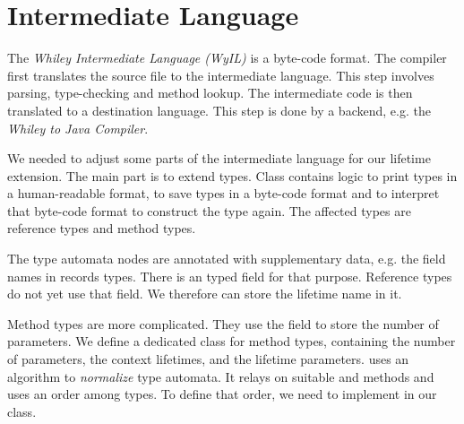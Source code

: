 \section{Intermediate Language}\label{section:wyil}

The \emph{Whiley Intermediate Language (WyIL)} is a byte-code format.
The \whiley compiler first translates the source file to the intermediate language.
This step involves parsing, type-checking and method lookup.
The intermediate code is then translated to a destination language.
This step is done by a backend, e.g. the \emph{Whiley to Java Compiler}.

We needed to adjust some parts of the intermediate language for our lifetime extension.
The main part is to extend types.
Class  contains logic to print types in a human-readable format, to save types in a byte-code format and to interpret that byte-code format to construct the type again.
The affected types are reference types and method types.

The type automata nodes are annotated with supplementary data, e.g. the field names in records types.
There is an  typed field  for that purpose.
Reference types do not yet use that field.
We therefore can store the lifetime name in it.

Method types are more complicated.
They use the  field to store the number of parameters.
We define a dedicated  class for method types, containing the number of parameters, the context lifetimes, and the lifetime parameters.
\whiley uses an algorithm to \emph{normalize} type automata.
It relays on suitable  and  methods and uses an order among types.
To define that order, we need to implement  in our  class.
